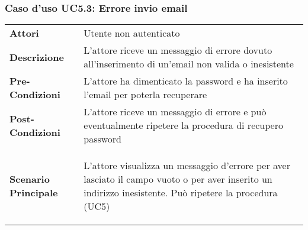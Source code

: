 \subsubsection{Caso d'uso UC5.3: Errore invio email}
\label{UC5_3}

\begin{minipage}{\linewidth}
\begin{longtable}{ l | p{11cm}}
	\hline
	\rowcolor{Gray}
	 \multicolumn{2}{c}{UC5.3 - Errore invio email} \\
	 \hline
	\textbf{Attori} & Utente non autenticato \\
	\textbf{Descrizione} & L'attore riceve un messaggio di errore dovuto all'inserimento di un'email non valida o inesistente \\
	\textbf{Pre-Condizioni} & L'attore ha dimenticato la password e ha inserito l'email per poterla recuperare \\
	\textbf{Post-Condizioni} & L'attore riceve un messaggio di errore e può eventualmente ripetere la procedura di recupero password \\
	\textbf{Scenario Principale} & \begin{enumerate*}[label=(\arabic*.),itemjoin={\newline}]
		\item L'attore visualizza un messaggio d'errore per aver lasciato il campo vuoto o per aver inserito un indirizzo inesistente. Può ripetere la procedura (UC5)
	\end{enumerate*}\\
\end{longtable}
\end{minipage}

